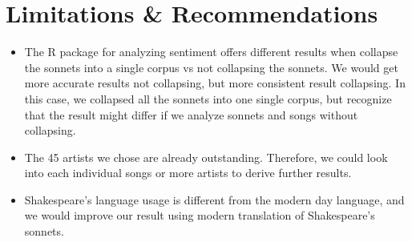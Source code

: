 \documentclass[10pt,a4paper]{article}
\begin{document}
\section{Limitations \& Recommendations}
\begin{itemize}

\item The R package for analyzing sentiment offers different results when collapse the sonnets into a single corpus vs not collapsing the sonnets. We would get more accurate results not collapsing, but more consistent result collapsing. In this case, we collapsed all the sonnets into one single corpus, but recognize that the result might differ if we analyze sonnets and songs without collapsing.
\item The 45 artists we chose are already outstanding. Therefore, we could look into each individual songs or more artists to derive further results.
\item Shakespeare’s language usage is different from the modern day language, and we would improve our result using modern translation of Shakespeare's sonnets.

\end{itemize}
\end{document}
